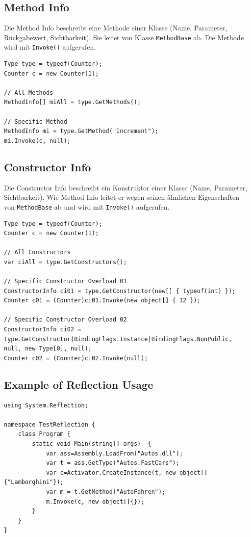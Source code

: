 \documentclass[
a4paper,
oneside,
10pt,
fleqn,
headsepline,
toc=listofnumbered, 
bibliography=totocnumbered]{scrartcl}
\begin{document}
\subsection{Method Info}
Die Method Info beschreibt eine Methode einer Klasse (Name, Parameter, Rückgabewert, Sichtbarkeit). Sie leitet von Klasse \lstinline|MethodBase| ab. Die Methode wird mit \lstinline|Invoke()| aufgerufen.
\begin{lstlisting}[caption=Reflection: Method Info]
Type type = typeof(Counter);
Counter c = new Counter(1);

// All Methods
MethodInfo[] miAll = type.GetMethods();

// Specific Method
MethodInfo mi = type.GetMethod("Increment");
mi.Invoke(c, null);
\end{lstlisting}

\subsection{Constructor Info}
Die Constructor Info beschreibt ein Konstruktor einer Klasse (Name, Parameter, Sichtbarkeit). Wie Method Info leitet er wegen seinen ähnlichen Eigenschaften von \lstinline|MethodBase| ab und wird  mit \lstinline|Invoke()| aufgerufen.
\begin{lstlisting}[caption=Reflection: Constructor Info]
Type type = typeof(Counter);
Counter c = new Counter(1);

// All Constructors
var ciAll = type.GetConstructors();

// Specific Constructor Overload 01
ConstructorInfo ci01 = type.GetConstructor(new[] { typeof(int) });
Counter c01 = (Counter)ci01.Invoke(new object[] { 12 });

// Specific Constructor Overload 02
ConstructorInfo ci02 = type.GetConstructor(BindingFlags.Instance|BindingFlags.NonPublic, null, new Type[0], null);
Counter c02 = (Counter)ci02.Invoke(null);
\end{lstlisting}


\subsection{Example of Reflection Usage}
\begin{lstlisting}
using System.Reflection;

namespace TestReflection {
    class Program {
        static void Main(string[] args)  {
            var ass=Assembly.LoadFrom("Autos.dll");
            var t = ass.GetType("Autos.FastCars");
            var c=Activator.CreateInstance(t, new object[] {"Lamborghini"});
            var m = t.GetMethod("AutoFahren");
            m.Invoke(c, new object[]{});
        }
    }
} 
\end{lstlisting}
\end{document}
